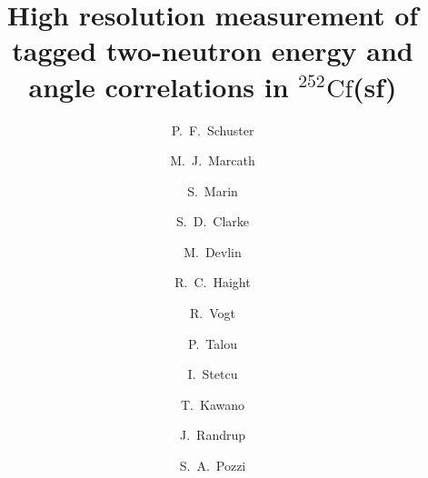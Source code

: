 \documentclass[preprint,12pt]{elsarticle}
\newcommand{\Cftft}{\ensuremath{^{252}\text{Cf}}\xspace}
\begin{document}
\begin{frontmatter}

\title{High resolution measurement of tagged two-neutron energy and angle correlations in \Cftft(sf)}





\author[umich]{P.~F.~Schuster}
\author[umich]{M.~J.~Marcath}
\author[umich]{S.~Marin}
\author[umich]{S.~D.~Clarke}
\author[lanl]{M.~Devlin}
\author[lanl]{R.~C.~Haight}
\author[llnl,ucdavis]{R.~Vogt}
\author[lanl]{P.~Talou}
\author[lanl]{I.~Stetcu}
\author[lanl]{T.~Kawano}
\author[lbnl]{J.~Randrup}
\author[umich]{S.~A.~Pozzi}


\address[umich]{Department of Nuclear Engineering and Radiological Sciences, University of Michigan, Ann Arbor, MI 48109, USA}
\address[lanl]{T-2, Los Alamos National Laboratory, Los Alamos, New Mexico, 87545, USA}
\address[llnl]{Nuclear and Chemical Sciences Division, Lawrence Livermore National Laboratory, Livermore, CA 94551, USA}
\address[ucdavis]{Department of Physics, University of California, Davis, California 95616, USA}
\address[lbnl]{Nuclear Science Division, Lawrence Berkeley National Laboratory, Berkeley, CA, USA}


\begin{abstract}


\end{abstract}
\end{frontmatter}
\end{document}

